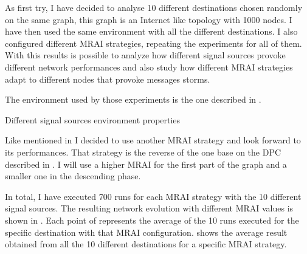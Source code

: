 As first try, I have decided to analyse \num{10} different destinations chosen randomly
on the same graph, this graph is an Internet like topology with \num{1000} nodes.
I have then used the same environment with all the different destinations.
I also configured different \ac{MRAI} strategies, repeating the experiments for all of
them.
With this results is possible to analyze how different signal sources provoke
different network performances and also study how different \ac{MRAI} strategies
adapt to different nodes that provoke messages storms.

The environment used by those experiments is the one described in
.

\begin{table}[h]
	
	\caption{Different signal sources environment properties}
	\label{tbl:source_properties}
\end{table}

Like mentioned in  I decided to use another
\ac{MRAI} strategy and look forward to its performances.
That strategy is the reverse of the one base on the \ac{DPC} described in
.
I will use a higher \ac{MRAI} for the first part of the graph and a smaller
one in the descending phase.

In total, I have executed \num{700} runs for each \ac{MRAI} strategy with the
\num{10} different signal sources.
The resulting network evolution with different \ac{MRAI} values is shown in
.
Each point of  represents the average
of the \num{10} runs executed for the specific destination with that \ac{MRAI}
configuration.
 shows the average result
obtained from all the \num{10} different destinations for a specific \ac{MRAI}
strategy.

